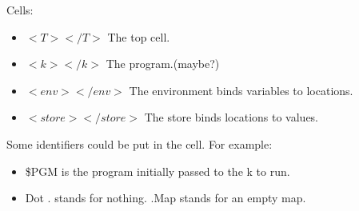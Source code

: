 \documentclass[a4paper]{article}
\begin{document}
Cells:
\begin{itemize}
    \item $<T></T>$   The top cell.
    \item $<k></k>$   The program.(maybe?)
    \item $<env></env>$   The environment binds variables to locations.
    \item $<store></store>$   The store binds locations to values.
\end{itemize}

Some identifiers could be put in the cell. For example:
\begin{itemize}
    \item \$PGM is the program initially passed to the k to run.
    \item Dot . stands for nothing. .Map stands for an empty map.
\end{itemize}
\end{document}
